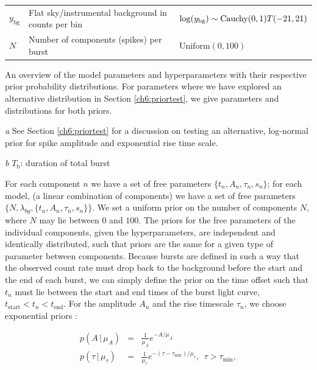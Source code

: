 \documentclass[12pt]{emulateapj}
\newcommand{\given}{\,|\,}
\newcommand{\counts}{y}
\newcommand{\mean}{\lambda}
\begin{document}
\begin{table}[hbtp]
\begin{threeparttable}
\begin{tabularx}{\textwidth}{p{2.0cm}p{10.0cm}X}
$\counts_{\mathrm{bg}}$ & Flat sky/instrumental background in counts per bin & $\log(\counts_{\mathrm{bg}}) \sim \textnormal{Cauchy}(0, 1)T(-21, 21)$ \\
$N$ & Number of components (spikes) per burst & $\mathrm{Uniform}(0,100)$  \\\bottomrule
\end{tabularx}
   \begin{tablenotes}
      \item{An overview of the model parameters and hyperparameters with their respective prior probability distributions. For parameters where we have explored an alternative distribution in Section 
\ref{ch6:priortest}, we give parameters and distributions for both priors.}
     \item[\emph{a}]{See Section \ref{ch6:priortest} for a discussion on testing an alternative, log-normal prior for spike amplitude and exponential rise time scale.}
     \item[\emph{b}]{$T_\mathrm{b}$: duration of total burst}
\end{tablenotes}
\end{threeparttable}
\label{tab:priortable}
\end{table}


For each component $n$ we have a set of free parameters $\{t_n, A_n, \tau_n, s_n \}$; for each model, (a 
linear combination of components) we have a set of free parameters $\{N,\mean_{bg}, \{t_n, A_n, \tau_n, s_n\} \}$.
We set a uniform prior on the number of components $N$, where $N$ may lie between $0$ and $100$. 
The priors for the free parameters of the individual components, given the hyperparameters, are independent and identically distributed, such that priors 
are the same for a given type of parameter between components. 
Because bursts are defined in such a way that the observed count rate must drop back to the background before the
start and the end of each burst, we can simply define the prior on the time offset such that $t_n$ must lie between
the start and end times of the burst light curve, $t_{\mathrm{start}} < t_n < t_\mathrm{end}$. 
For the amplitude $A_n$ and the rise timescale $\tau_n$, we choose exponential priors \citep{skilling1998}:

\begin{eqnarray}
    p(A \given \mu_A) &=& {\textstyle \frac{1}{\mu_A}}e^{-A/\mu_A} \\
    p(\tau \given \mu_{\tau}) &=& {\textstyle \frac{1}{\mu_\tau}}e^{-(\tau - \tau_{\mathrm{min}})/\mu_{\tau}}, ~~\tau>\tau_{\mathrm{min}},
\label{eqn:exponential_prior}
\end{eqnarray}
\end{document}
